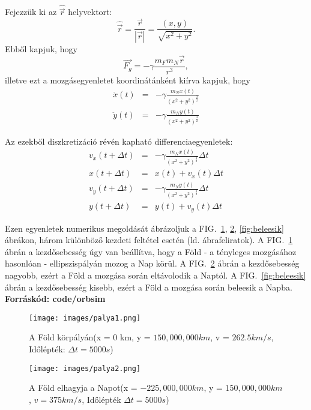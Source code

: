 \documentclass[%
 reprint,onecolumn,
 amsmath,amssymb,
 aps,
]{revtex4-2}
\begin{document}
Fejezzük ki az $\hat{\vec{r}}$ helyvektort:
\begin{equation}
    \hat{\vec{r}} = \frac{\vec{r}}{|\vec{r}|} = \frac{(x, y)}{\sqrt{x^{2} + y^{2}}}.
\end{equation}
Ebből kapjuk, hogy
\begin{equation}
    \vec{F_{g}} = - \gamma \frac{{m_{F} m_{N} \vec{r}}}{r^{3}},
\end{equation}
illetve ezt a mozgásegyenletet koordinátánként kiírva kapjuk, hogy 
\begin{eqnarray}
    \ddot{x}(t) &=& - \gamma \frac{m_{N} x(t)}{(x^{2} + y^{2})^{\frac{3}{2}}}
  \\
    \ddot{y}(t) &=& - \gamma \frac{m_{N} y(t)}{(x^{2} + y^{2})^{\frac{3}{2}}}
\end{eqnarray}

Az ezekből diszkretizáció révén kapható 
differenciaegyenletek:
\begin{eqnarray}
    v_{x}(t + \Delta t) &=& - \gamma \frac{m_{N} x(t)}{(x^2 + y^2)^\frac{3}{2}} \Delta t \\
    x(t + \Delta t) &=& x(t) + v_{x}(t) \Delta t \\
    v_{y}(t + \Delta t) &=& - \gamma \frac{m_{N} y(t)}{(x^2 + y^2)^\frac{3}{2}} \Delta t \\
    y(t + \Delta t) &=& y(t) + v_{y}(t) \Delta t
\end{eqnarray}

Ezen egyenletek numerikus megoldását ábrázoljuk a 
FIG.~\ref{fig:ottmarad},
\ref{fig:elhagyja}, \ref{fig:beleesik} ábrákon, 
három különböző kezdeti feltétel esetén (ld. ábrafeliratok).
A FIG.~\ref{fig:ottmarad} ábrán a kezdősebesség úgy van beállítva,
hogy a Föld - a tényleges mozgásához hasonlóan - ellipszispályán
mozog a Nap körül.
A FIG.~\ref{fig:elhagyja} ábrán a kezdősebesség nagyobb, 
ezért a Föld a mozgása során eltávolodik a Naptól. 
A FIG.~\ref{fig:beleesik} ábrán a kezdősebesség kisebb, 
ezért a Föld a mozgása során beleesik a Napba. \\
{\bf Forráskód: code/orbsim}


\begin{figure}[!h]
    \centering
    \texttt{[image: images/palya1.png]}
    \caption{A Föld körpályán(x = $0$ km, y = $150,000,000 km$, v = $262.5 km/s$, Időlépték: $\Delta t = 5000 s$)}
    \label{fig:ottmarad}
\end{figure}

\begin{figure}[!h]
    \centering
    \texttt{[image: images/palya2.png]}
    \caption{A Föld elhagyja a Napot(x = $-225,000,000 km$, y = $150,000,000 km$, $v = 375 km/s$, Időlépték $\Delta t = 5000 s$)}
    \label{fig:elhagyja}
\end{figure}
\end{document}
